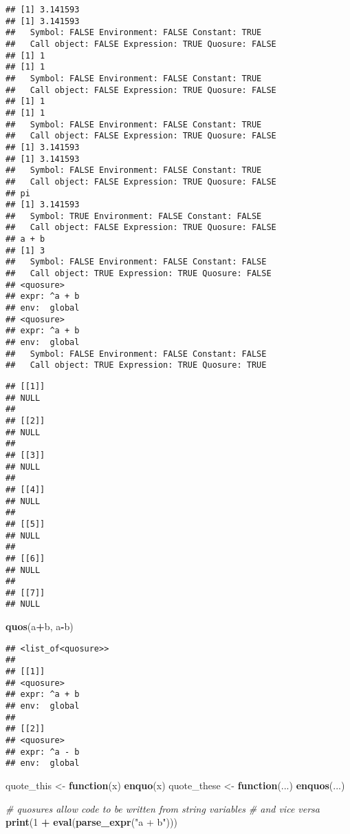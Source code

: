 \documentclass[]{book}
\newenvironment{Shaded}{\begin{snugshade}}{\end{snugshade}}
\newcommand{\KeywordTok}[1]{\textcolor[rgb]{0.13,0.29,0.53}{\textbf{#1}}}
\newcommand{\DecValTok}[1]{\textcolor[rgb]{0.00,0.00,0.81}{#1}}
\newcommand{\StringTok}[1]{\textcolor[rgb]{0.31,0.60,0.02}{#1}}
\newcommand{\CommentTok}[1]{\textcolor[rgb]{0.56,0.35,0.01}{\textit{#1}}}
\newcommand{\ControlFlowTok}[1]{\textcolor[rgb]{0.13,0.29,0.53}{\textbf{#1}}}
\newcommand{\OperatorTok}[1]{\textcolor[rgb]{0.81,0.36,0.00}{\textbf{#1}}}
\newcommand{\NormalTok}[1]{#1}
\begin{document}
\begin{verbatim}
## [1] 3.141593
## [1] 3.141593
##   Symbol: FALSE Environment: FALSE Constant: TRUE
##   Call object: FALSE Expression: TRUE Quosure: FALSE
## [1] 1
## [1] 1
##   Symbol: FALSE Environment: FALSE Constant: TRUE
##   Call object: FALSE Expression: TRUE Quosure: FALSE
## [1] 1
## [1] 1
##   Symbol: FALSE Environment: FALSE Constant: TRUE
##   Call object: FALSE Expression: TRUE Quosure: FALSE
## [1] 3.141593
## [1] 3.141593
##   Symbol: FALSE Environment: FALSE Constant: TRUE
##   Call object: FALSE Expression: TRUE Quosure: FALSE
## pi
## [1] 3.141593
##   Symbol: TRUE Environment: FALSE Constant: FALSE
##   Call object: FALSE Expression: TRUE Quosure: FALSE
## a + b
## [1] 3
##   Symbol: FALSE Environment: FALSE Constant: FALSE
##   Call object: TRUE Expression: TRUE Quosure: FALSE
## <quosure>
## expr: ^a + b
## env:  global
## <quosure>
## expr: ^a + b
## env:  global
##   Symbol: FALSE Environment: FALSE Constant: FALSE
##   Call object: TRUE Expression: TRUE Quosure: TRUE
\end{verbatim}

\begin{verbatim}
## [[1]]
## NULL
## 
## [[2]]
## NULL
## 
## [[3]]
## NULL
## 
## [[4]]
## NULL
## 
## [[5]]
## NULL
## 
## [[6]]
## NULL
## 
## [[7]]
## NULL
\end{verbatim}

\begin{Shaded}
\begin{Highlighting}[]
\KeywordTok{quos}\NormalTok{(a}\OperatorTok{+}\NormalTok{b, a}\OperatorTok{-}\NormalTok{b)}
\end{Highlighting}
\end{Shaded}

\begin{verbatim}
## <list_of<quosure>>
## 
## [[1]]
## <quosure>
## expr: ^a + b
## env:  global
## 
## [[2]]
## <quosure>
## expr: ^a - b
## env:  global
\end{verbatim}

\begin{Shaded}
\begin{Highlighting}[]
\NormalTok{quote_this <-}\StringTok{ }\ControlFlowTok{function}\NormalTok{(x) }\KeywordTok{enquo}\NormalTok{(x)}
\NormalTok{quote_these <-}\StringTok{ }\ControlFlowTok{function}\NormalTok{(...) }\KeywordTok{enquos}\NormalTok{(...)}
\end{Highlighting}
\end{Shaded}

\begin{Shaded}
\begin{Highlighting}[]
\CommentTok{# quosures allow code to be written from string variables}
\CommentTok{# and vice versa}
\KeywordTok{print}\NormalTok{(}\DecValTok{1} \OperatorTok{+}\StringTok{ }\KeywordTok{eval}\NormalTok{(}\KeywordTok{parse_expr}\NormalTok{(}\StringTok{"a + b"}\NormalTok{)))}
\end{Highlighting}
\end{Shaded}
\end{document}
